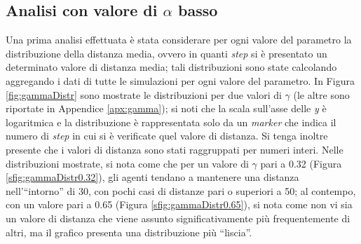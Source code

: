 \subsection{Analisi con valore di $\alpha$ basso}
\label{subsec:gammaalow}
Una prima analisi effettuata è stata considerare per ogni valore del parametro la distribuzione della distanza media, ovvero in quanti \textit{step} si è presentato un determinato valore di distanza media; tali distribuzioni sono state calcolando aggregando i dati di tutte le simulazioni per ogni valore del parametro.
In Figura \ref{fig:gammaDistr} sono mostrate le distribuzioni per due valori di $\gamma$ (le altre sono riportate in Appendice \ref{apx:gamma}); si noti che la scala sull'asse delle \textit{y} è logaritmica e la distribuzione è rappresentata solo da un \textit{marker} che indica il numero di \textit{step} in cui si è verificate quel valore di distanza. Si tenga inoltre presente che i valori di distanza sono stati raggruppati per numeri interi.
Nelle distribuzioni mostrate, si nota come che per un valore di $\gamma$ pari a 0.32 (Figura \ref{sfig:gammaDistr0.32}), gli agenti tendano a mantenere una distanza nell'“intorno” di 30, con pochi casi di distanze pari o superiori a 50; al contempo, con un valore pari a 0.65 (Figura \ref{sfig:gammaDistr0.65}), si nota come non vi sia un valore di distanza che viene assunto significativamente più frequentemente di altri, ma il grafico presenta una distribuzione più “liscia”.\\
